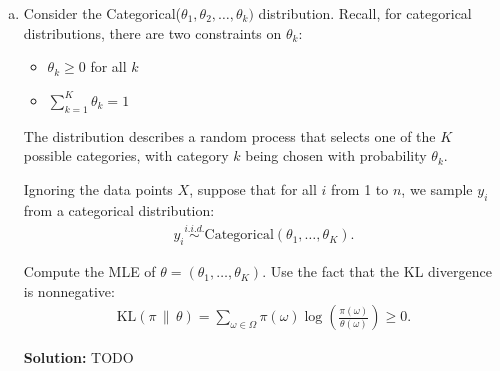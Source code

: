 \documentclass{article}
\DeclareMathOperator*{\argmin}{arg\,min}
\newenvironment{solution}{\color{blue} \smallskip \textbf{Solution:}}{}
\begin{document}
\begin{enumerate}[(a)]
    Show that the MLE estimate of $w$ can be found by solving the following optimization problem
    \begin{align*}
        w_{\text{MLE}} = \argmin_{w} \|A(Xw - y)\|_{2}^{2}.
    \end{align*}
    Clearly state what the matrix $A$ equals.
    
    \begin{solution}
        TODO
    \end{solution}

    \newpage
    \item %
    Consider the Categorical($\theta_{1}, \theta_{2}, \ldots, \theta_{k})$ distribution. Recall, for categorical distributions, there are two constraints on $\theta_{k}$:
    \begin{itemize}
        \item $\theta_{k} \geq 0$ for all $k$
        \item $\sum_{k = 1}^{K} \theta_{k} = 1$
    \end{itemize}
    The distribution describes a random process that selects one of the $K$ possible categories, with category $k$ being chosen with probability $\theta_{k}$.

    Ignoring the data points $X$, suppose that for all $i$ from 1 to $n$, we sample $y_{i}$ from a categorical distribution:
    \begin{align*}
        y_i \stackrel{i.i.d.}{\sim} \mathrm{Categorical}(\theta_1,\ldots, \theta_K).
    \end{align*}

    Compute the MLE of $\theta = (\theta_1,\ldots, \theta_K)$. Use the fact that the KL divergence is nonnegative: 
    \begin{align*}
        \mathrm{KL}(\pi\,\|\, \theta) = \sum_{\omega\in\Omega} \pi(\omega)\log\left(\frac{\pi(\omega)}{\theta(\omega)}\right)\geq 0.
    \end{align*}

    \begin{solution}
        TODO
    \end{solution}


\end{enumerate}
\end{document}

